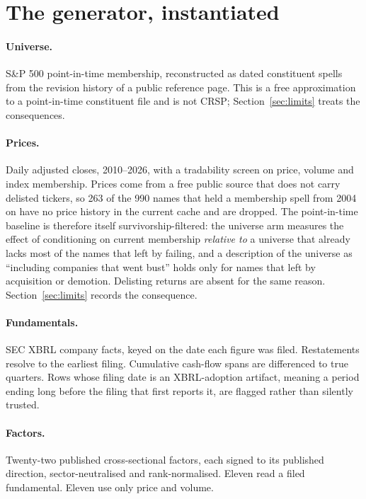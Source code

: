 \documentclass[11pt]{article}
\begin{document}
\section{The generator, instantiated}
\label{sec:data}

\paragraph{Universe.} S\&P 500 point-in-time membership, reconstructed as dated
constituent spells from the revision history of a public reference page. This is a free
approximation to a point-in-time constituent file and is not CRSP;
Section~\ref{sec:limits} treats the consequences.

\paragraph{Prices.} Daily adjusted closes, 2010--2026, with a tradability screen on
price, volume and index membership. Prices come from a free public source that does not
carry delisted tickers, so 263 of the 990 names that held a membership spell from 2004 on
have no price history in the current cache and are dropped. The point-in-time baseline is therefore itself survivorship-filtered: the
universe arm measures the effect of conditioning on current membership \emph{relative to}
a universe that already lacks most of the names that left by failing, and a
description of the universe as ``including companies that went bust'' holds only for
names that left by acquisition or demotion. Delisting returns are absent for the same
reason. Section~\ref{sec:limits} records the consequence.

\paragraph{Fundamentals.} SEC XBRL company facts, keyed on the date each figure was
filed. Restatements resolve to the earliest filing. Cumulative cash-flow spans are
differenced to true quarters. Rows whose filing date is an XBRL-adoption artifact,
meaning a period ending long before the filing that first reports it, are flagged rather
than silently trusted.

\paragraph{Factors.} Twenty-two published cross-sectional factors, each signed to its
published direction, sector-neutralised and rank-normalised. Eleven read a filed
fundamental. Eleven use only price and volume.
\end{document}
